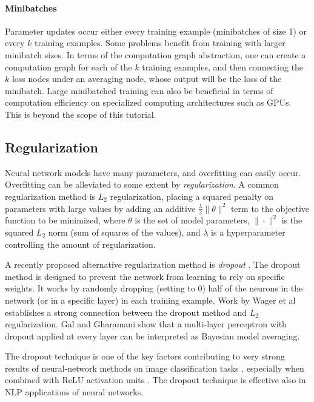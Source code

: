 \documentclass[jair,twoside,11pt,theapa]{article}
\renewcommand{\shortcite}[0]{\citeyear}
\begin{document}
{\paragraph{Minibatches} Parameter updates occur either every training
example (minibatches of size 1) or every $k$ training examples. 
Some problems benefit from training with larger minibatch sizes.
In terms of the computation graph abstraction, one can create
a computation graph for each of the $k$ training examples, and then connecting
the $k$ loss nodes under an averaging node, whose output will be the loss
of the minibatch. 
Large minibatched training can also be beneficial in terms of computation
efficiency on specialized computing architectures such as GPUs.  This is beyond
the scope of this tutorial.

\subsection{Regularization}
\label{sec:dropout}

Neural network models have many parameters, and overfitting can easily occur.
Overfitting can be alleviated to some extent by \emph{regularization}.
A common regularization method is $L_2$ regularization, placing a squared
penalty on parameters with large values by adding an additive $\frac{\lambda}{2}\|\theta\|^2$ term
to the objective function to be minimized, where $\theta$ is the set of model
parameters, $\|\cdot\|^2$ is the squared $L_2$ norm (sum of squares of the
values), and $\lambda$ is a hyperparameter controlling the amount of
regularization.

A recently proposed alternative regularization method is \emph{dropout}
\cite{hinton2012improving}.  The dropout method is designed to prevent the
network from learning to rely on specific weights.  It works by randomly
dropping (setting to 0) half of the neurons in the network (or in a specific
layer) in each training example.  
Work by Wager et al
\shortcite{wager2013dropout} establishes a strong connection between the dropout
method and $L_2$ regularization.  Gal and Gharamani \shortcite{gal2015dropout}
show that a multi-layer perceptron with dropout applied at every layer can be
interpreted as Bayesian model averaging.

The dropout technique is one of the key factors
contributing to very strong results of neural-network methods on image
classification tasks \cite{krizhevsky2012imagenet}, especially when combined
with ReLU activation units \cite{dahl2013improving}.  The dropout technique
is effective also in NLP applications of neural networks.  

}
\end{document}
